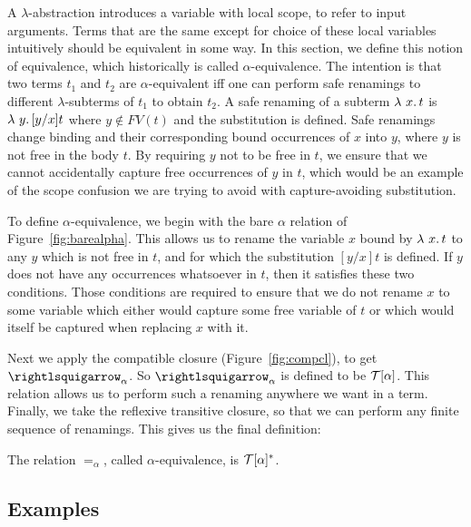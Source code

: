 A $\lambda$-abstraction introduces a
variable with local scope, to refer to input arguments.  Terms that
are the same except for choice of these local variables intuitively
should be equivalent in some way.  In this section, we define this
notion of equivalence, which historically is called
$\alpha$-equivalence.  The intention is
that two terms $t_1$ and $t_2$ are $\alpha$-equivalent iff one can
perform safe renamings to different $\lambda$-subterms of $t_1$ to
obtain $t_2$.  A safe renaming of a subterm $\lambda\ x.\, t$ is
$\lambda\ y.\, [y/x]t$ where $y\not\in\textit{FV}(t)$ and the substitution
is defined.  Safe renamings
change binding and their corresponding bound occurrences of $x$ into
$y$, where $y$ is not free in the body $t$.  By requiring $y$ not to
be free in $t$, we ensure that we cannot accidentally capture free
occurrences of $y$ in $t$, which would be an example of the scope
confusion we are trying to avoid with capture-avoiding substitution.

To define $\alpha$-equivalence, we begin with the bare $\alpha$
relation of Figure~\ref{fig:barealpha}.  This allows us to rename the
variable $x$ bound by $\lambda\ x.\, t$ to any $y$ which is not free in
$t$, and for which the substitution $[y/x] t$ is defined.  If $y$ does
not have any occurrences whatsoever in $t$, then it satisfies these
two conditions.  Those conditions are required to ensure that we do
not rename $x$ to some variable which either would capture some free
variable of $t$ or which would itself be captured when replacing $x$
with it.

Next we apply the compatible closure (Figure~\ref{fig:compcl}), to get
$\curva_\alpha$.  So $\curva_\alpha$ is defined to be $\mathcal{T}[\alpha]$.
This relation allows us to perform such a renaming anywhere we want in
a term.  Finally, we take the reflexive transitive closure, so that we
can perform any finite sequence of renamings.  This gives us the final
definition:

\begin{definition}
\label{def:alpha}
  The relation $=_\alpha$, called $\alpha$-equivalence, is $\mathcal{T}[\alpha]^*$.\index{$=_\alpha$}
  \end{definition}

\subsection{Examples}

